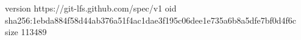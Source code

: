 version https://git-lfs.github.com/spec/v1
oid sha256:1ebda884f58d44ab376a51f4ac1dae3f195c06dee1e735a6b8a5dfe7bf0d4f6c
size 113489
